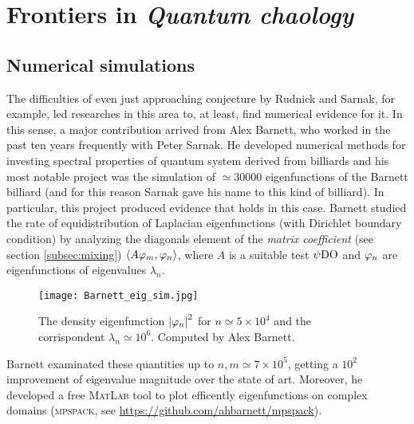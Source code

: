 
\chapter{Frontiers in \emph{Quantum chaology}} %

\label{Chapter6} %
\thispagestyle{empty}

\section{Numerical simulations}

The difficulties of even just approaching \QUE conjecture by Rudnick and Sarnak, for example, led researches in this area to, at least, find numerical evidence for it. In this sense, a major contribution arrived from Alex Barnett, who worked in the past ten years frequently with Peter Sarnak. He developed numerical methods for investing spectral properties of quantum system derived from billiards and his most notable project was the simulation of $\simeq30000$ eigenfunctions of the Barnett billiard (and for this reason Sarnak gave his name to this kind of billiard). In particular, this project produced evidence that \QUE holds in this case. Barnett studied the rate of equidistribution of Laplacian eigenfunctions (with Dirichlet boundary condition) by analyzing the diagonals element of the \emph{matrix coefficient} (see section \ref{subsec:mixing}) $\left< A\varphi_{m},\varphi_{n}\right>$, where $A$ is a suitable test $\operatorname{\psi DO}$ and $\varphi_{n}$ are eigenfunctions of eigenvalues $\lambda_{n}$.


\begin{figure}[H]
\centering
    \texttt{[image: Barnett\_eig\_sim.jpg]}
  \noindent\\
  \decoRule
  \caption{The density eigenfunction $\left| \varphi_{n}\right|^{2}$ for $n\simeq5\times10^{4}$ and the corrispondent $\lambda_{n}\simeq10^{6}$. Computed by Alex Barnett.}
  \label{fig:barnett_eigenfunction}
\end{figure}


Barnett examinated these quantities up to $n,m\simeq 7\times10^{5}$, getting a $10^{2}$ improvement of eigenvalue magnitude over the state of art. Moreover, he developed a free \textsc{MatLab} tool to plot efficently eigenfunctions on complex domains (\textsc{mpspack}, see \url{https://github.com/ahbarnett/mpspack}).\\

